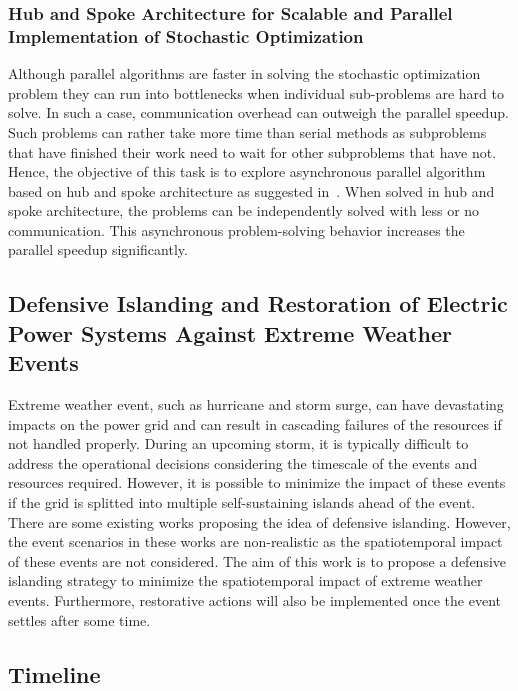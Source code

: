 \subsubsection{Hub and Spoke Architecture for Scalable and Parallel Implementation of Stochastic Optimization}
Although parallel algorithms are faster in solving the stochastic optimization problem they can run into bottlenecks when individual sub-problems are hard to solve. In such a case, communication overhead can outweigh the parallel speedup. Such problems can rather take more time than serial methods as subproblems that have finished their work need to wait for other subproblems that have not. Hence, the objective of this task is to explore asynchronous parallel algorithm based on hub and spoke architecture as suggested in~\cite{knueven2020parallel}. When solved in hub and spoke architecture, the problems can be independently solved with less or no communication. This asynchronous problem-solving behavior increases the parallel speedup significantly. 

\subsection{Defensive Islanding and Restoration of Electric Power Systems Against Extreme Weather Events}
Extreme weather event, such as hurricane and storm surge, can have devastating impacts on the power grid and can result in cascading failures of the resources if not handled properly. During an upcoming storm, it is typically difficult to address the operational decisions considering the timescale of the events and resources required. However, it is possible to minimize the impact of these events if the grid is splitted into multiple self-sustaining islands ahead of the event. There are some existing works proposing the idea of defensive islanding. However, the event scenarios in these works are non-realistic as the spatiotemporal impact of these events are not considered. The aim of this work is to propose a defensive islanding strategy to minimize the spatiotemporal impact of extreme weather events. Furthermore, restorative actions will also be implemented once the event settles after some time.    

\clearpage
\subsection{Timeline}
